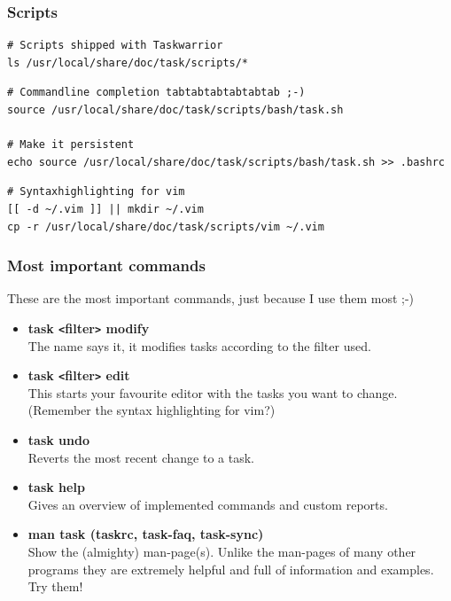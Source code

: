 \documentclass[t,handout]{beamer}
\begin{document}
\begin{frame}[fragile]\frametitle{Scripts}
    \vfill
    \begin{lstlisting}
# Scripts shipped with Taskwarrior
ls /usr/local/share/doc/task/scripts/*\end{lstlisting}

\begin{lstlisting}
# Commandline completion tabtabtabtabtabtab ;-)
source /usr/local/share/doc/task/scripts/bash/task.sh

# Make it persistent
echo source /usr/local/share/doc/task/scripts/bash/task.sh >> .bashrc\end{lstlisting}

\begin{lstlisting}
# Syntaxhighlighting for vim
[[ -d ~/.vim ]] || mkdir ~/.vim
cp -r /usr/local/share/doc/task/scripts/vim ~/.vim\end{lstlisting}
\end{frame}

\begin{frame}[fragile]\frametitle{Most important commands}
    These are the most important commands, just because I use them most ;-)

    \begin{itemize}
        \item \textbf{task {\tt<}filter{\tt>} modify} \\
        The name says it, it modifies tasks according to the filter used. \pause
        \item \textbf{task {\tt<}filter{\tt>} edit} \\
        This starts your favourite editor with the tasks you want to change. \\
        (Remember the syntax highlighting for vim?) \pause
        \item \textbf{task undo} \\
        Reverts the most recent change to a task. \pause
        \item \textbf{task help} \\
        Gives an overview of implemented commands and custom reports. \pause
        \item \textbf{man task (taskrc, task-faq, task-sync)} \\
        Show the (almighty) man-page(s). Unlike the man-pages of many other
        programs they are extremely helpful and full of information and examples.
        Try them!
    \end{itemize}
\end{frame}
\end{document}
